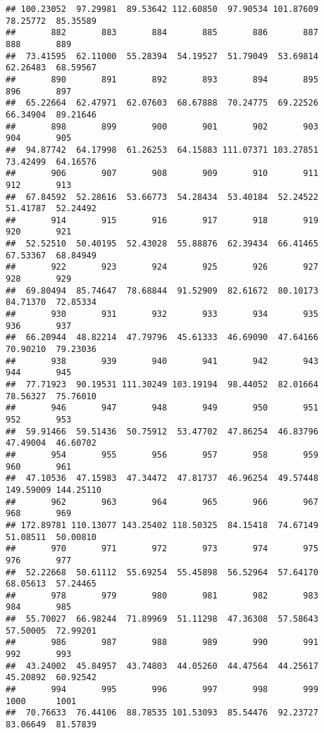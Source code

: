 \documentclass[
]{article}
\begin{document}
\begin{verbatim}
## 100.23052  97.29981  89.53642 112.60850  97.90534 101.87609  78.25772  85.35589 
##       882       883       884       885       886       887       888       889 
##  73.41595  62.11000  55.28394  54.19527  51.79049  53.69814  62.26483  68.59567 
##       890       891       892       893       894       895       896       897 
##  65.22664  62.47971  62.07603  68.67888  70.24775  69.22526  66.34904  89.21646 
##       898       899       900       901       902       903       904       905 
##  94.87742  64.17998  61.26253  64.15883 111.07371 103.27851  73.42499  64.16576 
##       906       907       908       909       910       911       912       913 
##  67.84592  52.28616  53.66773  54.28434  53.40184  52.24522  51.41787  52.24492 
##       914       915       916       917       918       919       920       921 
##  52.52510  50.40195  52.43028  55.88876  62.39434  66.41465  67.53367  68.84949 
##       922       923       924       925       926       927       928       929 
##  69.80494  85.74647  78.68844  91.52909  82.61672  80.10173  84.71370  72.85334 
##       930       931       932       933       934       935       936       937 
##  66.20944  48.82214  47.79796  45.61333  46.69090  47.64166  70.90210  79.23036 
##       938       939       940       941       942       943       944       945 
##  77.71923  90.19531 111.30249 103.19194  98.44052  82.01664  78.56327  75.76010 
##       946       947       948       949       950       951       952       953 
##  59.91466  59.51436  50.75912  53.47702  47.86254  46.83796  47.49004  46.60702 
##       954       955       956       957       958       959       960       961 
##  47.10536  47.15983  47.34472  47.81737  46.96254  49.57448 149.59009 144.25110 
##       962       963       964       965       966       967       968       969 
## 172.89781 110.13077 143.25402 118.50325  84.15418  74.67149  51.08511  50.00810 
##       970       971       972       973       974       975       976       977 
##  52.22668  50.61112  55.69254  55.45898  56.52964  57.64170  68.05613  57.24465 
##       978       979       980       981       982       983       984       985 
##  55.70027  66.98244  71.89969  51.11298  47.36308  57.58643  57.50005  72.99201 
##       986       987       988       989       990       991       992       993 
##  43.24002  45.84957  43.74803  44.05260  44.47564  44.25617  45.20892  60.92542 
##       994       995       996       997       998       999      1000      1001 
##  70.76633  76.44106  88.78535 101.53093  85.54476  92.23727  83.06649  81.57839 

\end{verbatim}
\end{document}
